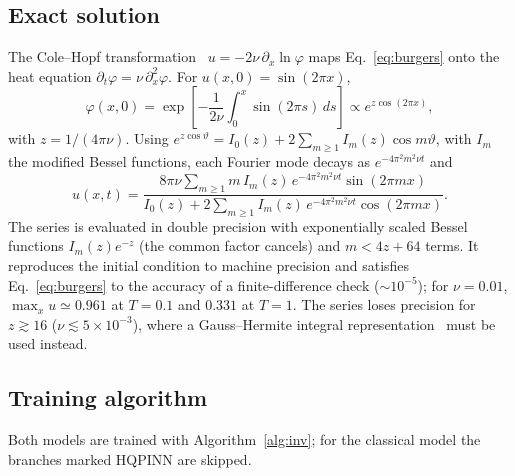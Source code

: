\documentclass[floatfix,aps,pra,twocolumn,superscriptaddress,10pt,nofootinbib]{revtex4-2}
\newcounter{algorithm}
\begin{document}
\begin{appendices}
\subsection{Exact solution}\label{app:colehopf}
The Cole--Hopf transformation~\cite{cole1951quasi,hopf1950partial} $u=-2\nu\,\partial_x\ln\varphi$ maps Eq.~\eqref{eq:burgers} onto the heat equation $\partial_t\varphi=\nu\,\partial_x^2\varphi$. For $u(x,0)=\sin(2\pi x)$,
\begin{equation}
  \varphi(x,0)=\exp\!\left[-\frac{1}{2\nu}\int_0^x\sin(2\pi s)\,ds\right]\propto e^{z\cos(2\pi x)},
\end{equation}
with $z=1/(4\pi\nu)$. Using $e^{z\cos\vartheta}=I_0(z)+2\sum_{m\ge1}I_m(z)\cos m\vartheta$, with $I_m$ the modified Bessel functions, each Fourier mode decays as $e^{-4\pi^2m^2\nu t}$ and
\begin{equation}
  u(x,t)=\frac{8\pi\nu\sum_{m\ge1}m\,I_m(z)\,e^{-4\pi^2m^2\nu t}\sin(2\pi m x)}{I_0(z)+2\sum_{m\ge1}I_m(z)\,e^{-4\pi^2m^2\nu t}\cos(2\pi m x)}.
  \label{eq:colehopf}
\end{equation}
The series is evaluated in double precision with exponentially scaled Bessel functions $I_m(z)e^{-z}$ (the common factor cancels) and $m<4z+64$ terms. It reproduces the initial condition to machine precision and satisfies Eq.~\eqref{eq:burgers} to the accuracy of a finite-difference check ($\sim10^{-5}$); for $\nu=0.01$, $\max_x u\simeq0.961$ at $T=0.1$ and $0.331$ at $T=1$. The series loses precision for $z\gtrsim16$ ($\nu\lesssim5\times10^{-3}$), where a Gauss--Hermite integral representation~\cite{basdevant1986spectral} must be used instead.

\subsection{Training algorithm}\label{app:training}
Both models are trained with Algorithm~\ref{alg:inv}; for the classical model the branches marked HQPINN are skipped.


\end{appendices}
\end{document}
